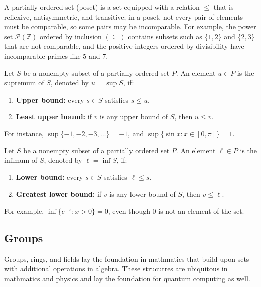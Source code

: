 \documentclass[12pt]{article}
\begin{document}
\vspace{12pt}


\begin{definition}
A partially ordered set (poset) is a set equipped with a relation $\le$ that is reflexive, antisymmetric, and transitive; in a poset, not every pair of elements must be comparable, so some pairs may be incomparable. For example, the power set $\mathcal{P}(\mathbb{Z})$ ordered by inclusion $(\subseteq)$ contains subsets such as $\{1,2\}$ and $\{2,3\}$ that are not comparable, and the positive integers ordered by divisibility have incomparable primes like $5$ and $7$.
\end{definition}
\vspace{12pt}


\begin{definition}[Supremum]
Let $S$ be a nonempty subset of a partially ordered set $P$. An element $u \in P$ is the supremum of $S$, denoted by $u=\sup S$, if:
\begin{enumerate}
\item \textbf{Upper bound:} every $s\in S$ satisfies $s \le u$.
\item \textbf{Least upper bound:} if $v$ is any upper bound of $S$, then $u \le v$.
\end{enumerate}
For instance, $\sup\{-1,-2,-3,\dots\}=-1$, and $\sup\{\sin x: x\in[0,\pi]\}=1$.
\end{definition}
\vspace{12pt}

\begin{definition}[Infimum]
Let $S$ be a nonempty subset of a partially ordered set $P$. An element $\ell \in P$ is the infimum of $S$, denoted by $\ell=\inf S$, if:
\begin{enumerate}
\item \textbf{Lower bound:} every $s\in S$ satisfies $\ell \le s$.
\item \textbf{Greatest lower bound:} if $v$ is any lower bound of $S$, then $v \le \ell$.
\end{enumerate}
For example, $\inf\{e^{-x}: x>0\}=0$, even though $0$ is not an element of the set.
\end{definition}


\subsection{Groups}

Groups, rings, and fields lay the foundation in mathmatics that build upon sets with additional operations in algebra. These strucutres are ubiquitous in mathmatics and physics and lay the foundation for quantum computing as well. 
\end{document}
